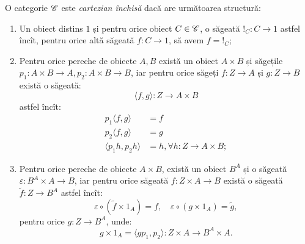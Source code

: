 \documentclass[a4paper]{article}
\begin{document}
\begin{definition}\label{def:ccc}
  O categorie $ \mathscr{C} $ este \emph{cartezian închisă} dacă are următoarea
  structură:
  \begin{enumerate}[(1)]
    \item Un obiect distins $ 1 $ și pentru orice obiect $ C \in \mathscr{C} $, o săgeată
      $ !_C : C \to 1 $ astfel încît, pentru orice altă săgeată $ f : C \to 1 $,
      să avem $ f = !_C $;
    \item Pentru orice pereche de obiecte $ A, B $ există un obiect $ A \times B $
      și săgețile $ p_1 : A \times B \to A, p_2 : A \times B \to B $, iar pentru
      orice săgeți $ f : Z \to A $ și $ g : Z \to B $ există o săgeată:
      \[
          \langle f, g \rangle : Z \to A \times B
      \]
      astfel încît:
      \begin{align*}
        p_1 \langle f, g \rangle &= f \\
        p_2 \langle f, g \rangle &= g \\
        \langle p_1 h, p_2 h \rangle &= h, \forall h : Z \to A \times B;
      \end{align*}
    \item Pentru orice pereche de obiecte $ A \times B $, există un obiect
    $ B^A $ și o săgeată $ \varepsilon : B^A \times A \to B $, iar pentru orice
    săgeată $ f : Z \times A \to B $ există o săgeată $ \widetilde{f} : Z \to B^A $
    astfel încît:
    \[
      \varepsilon \circ (\widetilde{f} \times 1_A) = f, \quad %
      \varepsilon \circ (g \times 1_A) = \widetilde{g},
    \]
    pentru orice $ g : Z \to B^A $, unde:
    \[
      g \times 1_A = \langle gp_1, p_2 \rangle : Z \times A \to B^A \times A.
    \]
  \end{enumerate}
\end{definition}
\end{document}
